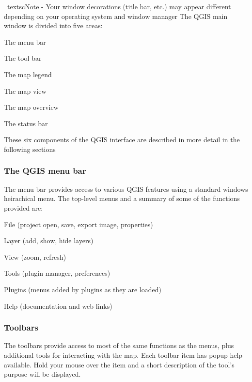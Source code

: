 \documentclass[10pt,english]{article}
\begin{document}
\begin{onehalfspace}
\begin{figure}[h]
\end{figure}
\
textsc{Note - Your window decorations (title bar, etc.) may appear different depending on your operating system and window manager}
The QGIS main window is divided into five areas:
\begin{compactenum}
\item The menu bar
\item The tool bar
\item The map legend
\item The map view
\item The map overview
\item The status bar
\end{compactenum}

These six components of the QGIS interface are described in more detail in the following sections
\subsubsection{The QGIS menu bar}

The menu bar provides access to various QGIS features using a standard windows
heirachical menu. The top-level menus and a summary of some of the functions provided are:
\begin{compactitem}
\item File (project open, save, export image, properties)
\item Layer (add, show, hide layers)
\item View (zoom, refresh)
\item Tools (plugin manager, preferences)
\item Plugins (menus added by plugins as they are loaded)
\item Help (documentation and web links)
\end{compactitem}

\subsubsection{Toolbars}
The toolbars provide access to most of the same functions as the menus, plus
additional tools for interacting with the map. Each toolbar item has popup
help available. Hold your mouse over the item and a short description of the
tool's purpose will be displayed. %


\end{onehalfspace}
\end{document}
